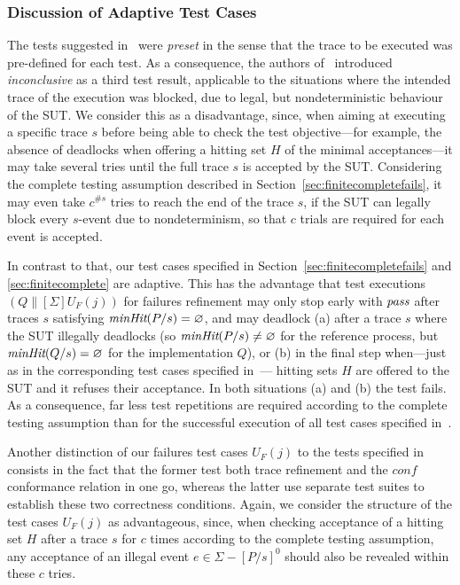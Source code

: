 \subsubsection*{Discussion of Adaptive Test Cases}
The tests suggested
in~\cite{Hennessy:1988:ATP:50497,DBLP:conf/icfem/CavalcantiG07} were \emph{preset} in the
sense that the trace to be executed was pre-defined for each test. As a consequence,
the authors of~\cite{DBLP:conf/icfem/CavalcantiG07} introduced \emph{inconclusive}
as a third test result, applicable to the situations where the intended trace
of the execution was blocked, due to legal, but nondeterministic behaviour of the
SUT. We consider this as a disadvantage, since, when aiming at executing a specific trace $s$
before being able to check the test objective---for example, the absence of deadlocks when offering a hitting set $H$ of the minimal acceptances---it may take several tries until the full trace $s$ is accepted by the SUT. Considering the complete testing assumption described in Section~\ref{sec:finitecompletefails}, it may even take $c^{\#s}$ tries to reach the end of the trace $s$, if the SUT can legally block every $s$-event due to nondeterminism, so that $c$ 
trials are required for each event is accepted.

In  contrast to that, our test cases specified in
Section~\ref{sec:finitecompletefails} and \ref{sec:finitecomplete} are
adaptive. This has the advantage that test executions $(Q\parallel[\Sigma]
U_F(j))$ for failures refinement 
may only stop early with ${\text{\it pass}}$ 
after traces $s$ satisfying $\text{\it minHit}(P/s) = \varnothing$, and may deadlock 
(a) after a trace $s$ where the SUT illegally deadlocks (so $\text{\it minHit}(P/s) \neq \varnothing$ for
the reference process, but $\text{\it minHit}(Q/s) = \varnothing$ for the implementation $Q$), or
(b) 
in the final 
step when---just as in the corresponding test cases specified in~\cite{DBLP:conf/icfem/CavalcantiG07}--- hitting sets $H$ are offered to the SUT and it refuses their acceptance.
In both situations (a) and (b) the test fails. As a consequence, far less test repetitions are required according to the complete testing assumption than for the successful execution of all 
test cases specified in~\cite{DBLP:conf/icfem/CavalcantiG07}.

Another distinction of our failures test cases $U_F(j)$ to the tests specified in~\cite{DBLP:conf/icfem/CavalcantiG07} consists in the fact that the former test both trace refinement and
the $conf$ conformance relation in one go, whereas the latter use separate test suites to 
establish these two correctness conditions. Again, we consider the  
structure of the  test cases 
$U_F(j)$ as advantageous, since, when checking acceptance of a hitting set $H$ 
after a trace $s$ for $c$ times according to the complete testing assumption,  
any acceptance of an illegal event $e\in\Sigma - [P/s]^0$ should also be revealed within these $c$ tries.


